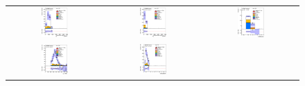 \clearpage
\begin{figure}[htbp]
\begin{center}
\begin{tabular}{ccc}
%
\includegraphics[width=0.30\textwidth]{appendices/figures/sdrs/JetPtB1_ELEMUONCR2_1W_NOMINAL.eps}  &
\includegraphics[width=0.30\textwidth]{appendices/figures/sdrs/JetPtB2_ELEMUONCR2_1W_NOMINAL.eps} &
\includegraphics[width=0.30\textwidth]{appendices/figures/sdrs/nWhad_ELEMUONCR2_1W_NOMINAL_logscale.eps} \\
\includegraphics[width=0.30\textwidth]{appendices/figures/sdrs/VLQAna_WbX_W1Pt_ELEMUONCR2_1W_NOMINAL.eps} &
\includegraphics[width=0.30\textwidth]{appendices/figures/sdrs/VLQAna_WbX_DRLepMet_ELEMUONCR2_1W_NOMINAL.eps} &

\end{tabular}
\end{center}
\end{figure}
